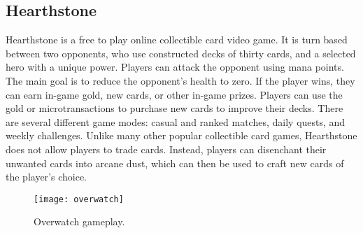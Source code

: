 \subsection{Hearthstone}
Hearthstone is a free to play online collectible card video game. It is turn based between two opponents, who use constructed decks of thirty cards, and a selected hero with a unique power. Players can attack the opponent using mana points. The main goal is to reduce the opponent's health to zero. If the player wins, they can earn in-game gold, new cards, or other in-game prizes. Players can use the gold or microtransactions to purchase new cards to improve their decks. There are several different game modes: casual and ranked matches, daily quests, and weekly challenges. Unlike many other popular collectible card games, Hearthstone does not allow players to trade cards. Instead, players can disenchant their unwanted cards into arcane dust, which can then be used to craft new cards of the player's choice. 

\begin{figure}[h]
\centering
\texttt{[image: overwatch]}
\caption{Overwatch gameplay.}
\end{figure}
